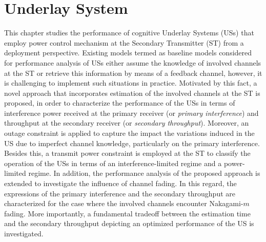 \chapter{Underlay System}
\label{chap:US}


This chapter studies the performance of cognitive Underlay Systems (USs) that employ power control mechanism at the Secondary Transmitter (ST) from a deployment perspective. Existing models termed as baseline models considered for performance analysis of USs either assume the knowledge of involved channels at the ST or retrieve this information by means of a feedback channel, however, it is challenging to implement such situations in practice. Motivated by this fact, a novel approach that incorporates estimation of the involved channels at the ST is proposed, in order to characterize the performance of the USs in terms of interference power received at the primary receiver (or \textit{primary interference}) and throughput at the secondary receiver (or \textit{secondary throughput}). Moreover, an outage constraint is applied to capture the impact the variations induced in the US due to imperfect channel knowledge, particularly on the primary interference. 
Besides this, a transmit power constraint is employed at the ST to classify the operation of the USs in terms of an interference-limited regime and a power-limited regime. In addition, the performance analysis of the proposed approach is extended to investigate the influence of channel fading. In this regard, the expressions of the primary interference and the secondary throughput are characterized for the case where the involved channels encounter Nakagami-$m$ fading. More importantly, a fundamental tradeoff between the estimation time and the secondary throughput depicting an optimized performance of the US is investigated. 

